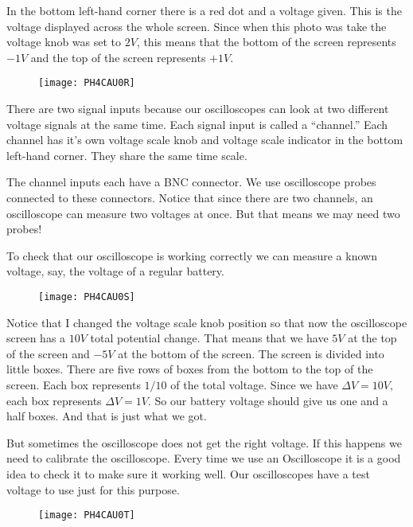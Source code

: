 In the bottom left-hand corner there is a red dot and a voltage given. This is the voltage displayed across the whole screen. Since when this photo was take the voltage knob was set to 
$2\unit{V}$, this means that the bottom of the screen represents $-1\unit{V}$ and the top of the screen represents $+1\unit{V}.$ 

\begin{figure}[h!]
	\centering
	\texttt{[image: PH4CAU0R]}
\end{figure}

There are two signal inputs because our oscilloscopes can look at two different voltage signals at the same time. Each signal input is called a ``channel.'' Each channel has it's own voltage scale knob and voltage scale indicator in the bottom left-hand corner. They share the same time scale.

The channel inputs each have a BNC connector. We use oscilloscope probes connected to these connectors. Notice that since there are two channels, an oscilloscope can measure two voltages at once. But that means we may need two probes!

To check that our oscilloscope is working correctly we can measure a known voltage, say, the voltage of a regular battery.

\begin{figure}[h!]
	\centering
	\texttt{[image: PH4CAU0S]}
\end{figure}

Notice that I changed the voltage scale knob position so that now the oscilloscope screen has a $10\unit{V}$ total potential change. That means that we have $5\unit{V}$ at the top of the screen and $-5\unit{V}$ at the bottom of the screen. The screen is divided into little boxes. There are five rows of boxes from the bottom to the top of the screen. Each box represents $1/10$ of the total voltage. Since we have $\Delta V=10\unit{V},$ each box represents $\Delta V=1\unit{V}. $ So our battery voltage should give us one and a half boxes. And that is just what we got.

But sometimes the oscilloscope does not get the right voltage. If this happens we need to calibrate the oscilloscope. Every time we use an Oscilloscope it is a good idea to check it to make sure it working well. Our oscilloscopes have a test voltage to use just for this purpose.

\begin{figure}[h!]
    \centering
    \texttt{[image: PH4CAU0T]}
\end{figure}

